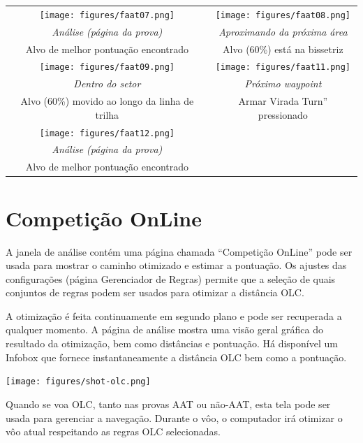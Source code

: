 \begin{maxipage}
\begin{center}
\begin{longtable}{|c|c|}
\toprule
\texttt{[image: figures/faat07.png]} & 
\texttt{[image: figures/faat08.png]} \\
{\em Análise (página da prova)} & {\em Aproximando da próxima área} \\
Alvo de melhor pontuação encontrado & Alvo  (60\%) está na bissetriz \\

\midrule
\texttt{[image: figures/faat09.png]} & 
\texttt{[image: figures/faat11.png]} \\
{\em Dentro do setor} & {\em Próximo waypoint} \\
Alvo  (60\%) movido ao longo da linha de trilha & Armar Virada Turn” pressionado \\

\midrule
\texttt{[image: figures/faat12.png]} &  \\
{\em Análise (página da prova)} &  \\
Alvo de melhor pontuação encontrado  &  \\

\bottomrule
\end{longtable}
\end{center}
\end{maxipage}

\section{Competição OnLine}

A janela de análise contém uma página chamada “Competição OnLine” pode ser usada para mostrar o caminho otimizado e estimar a pontuação.  
Os ajustes das configurações (página Gerenciador de Regras) permite que a seleção de quais conjuntos de regras podem ser usados para otimizar a distância OLC.

A otimização é feita continuamente em segundo plano e pode ser recuperada a qualquer momento.  A página de análise mostra uma visão geral gráfica do resultado da otimização, bem como distâncias e pontuação.  Há disponível um Infobox que fornece instantaneamente a distância OLC bem como a pontuação.

\begin{center}
\texttt{[image: figures/shot-olc.png]}
\end{center}

Quando se voa OLC, tanto nas provas AAT ou não-AAT, esta tela pode ser usada para gerenciar a navegação.  Durante o vôo, o computador irá otimizar o vôo atual respeitando as regras OLC selecionadas.

